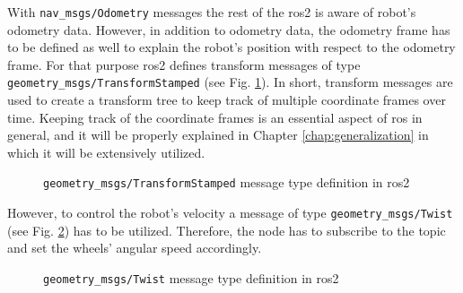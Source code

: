 With \texttt{nav\_msgs/Odometry} messages the rest of the \ac{ros2} is aware of robot's odometry data.
However, in addition to odometry data, the odometry frame has to be defined as well to explain the robot's position with respect to the odometry frame.
For that purpose \ac{ros2} defines transform messages of type \texttt{geometry\_msgs/TransformStamped} (see Fig. \ref{fig:simulation:transform}).
In short, transform messages are used to create a transform tree to keep track of multiple coordinate frames over time. 
Keeping track of the coordinate frames is an essential aspect of \ac{ros} in general, and it will be properly explained in Chapter \ref{chap:generalization} in which it will be extensively utilized.

\begin{figure}[H]
    \centering
    \begin{subfigure}[b]{0.9\textwidth}
    \end{subfigure}
    \caption{\texttt{geometry\_msgs/TransformStamped} message type definition in \ac{ros2}}
    \label{fig:simulation:transform}
\end{figure}
However, to control the robot's velocity a message of type \texttt{geometry\_msgs/Twist} (see Fig. \ref{fig:simulation:twist}) has to be utilized.
Therefore, the node has to subscribe to the topic and set the wheels' angular speed accordingly.

\begin{figure}[H]
    \centering
    \begin{subfigure}[b]{0.9\textwidth}
    \end{subfigure}
    \caption{\texttt{geometry\_msgs/Twist} message type definition in \ac{ros2}}
    \label{fig:simulation:twist}
\end{figure}

